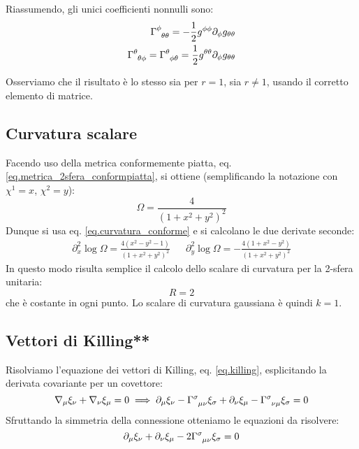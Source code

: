 Riassumendo, gli unici coefficienti nonnulli sono:
\begin{align*}
\tensor{\Gamma}{^\phi_{\theta\theta}} =  -\frac{1}{2}g^{\phi\phi}\partial_\phi g_{\theta\theta} \\
\tensor{\Gamma}{^\theta_{\theta\phi}} = \tensor{\Gamma}{^\theta_{\phi\theta}} =  \frac{1}{2}g^{\theta\theta}\partial_\phi g_{\theta\theta}
\end{align*}

Osserviamo che il risultato è lo stesso sia per $r=1$, sia $r\neq 1$, usando il corretto elemento di matrice.
\subsection{Curvatura scalare}
Facendo uso della metrica conformemente piatta, eq. \ref{eq.metrica_2sfera_conformpiatta}, si ottiene (semplificando la notazione con $\chi^1=x$, $\chi^2=y$):
\begin{equation*}
    \Omega = \frac{4}{(1 + x^2 + y^2)^2}
\end{equation*}
Dunque si usa eq. \ref{eq.curvatura_conforme} e si calcolano le due derivate seconde:
\begin{align*}
    \partial^2_x \log \Omega = \frac{4(x^2-y^2-1)}{(1+x^2+y^2)^2} & &
    \partial^2_y \log \Omega = -\frac{4(1 + x^2 - y^2)}{(1+x^2+y^2)^2}
\end{align*}
In questo modo risulta semplice il calcolo dello scalare di curvatura per la 2-sfera unitaria:
\begin{equation*}
    R=2
\end{equation*}
che è costante in ogni punto. Lo scalare di curvatura gaussiana è quindi $k=1$.
\subsection{Vettori di Killing**}
Risolviamo l'equazione dei vettori di Killing, eq. \ref{eq.killing}, esplicitando la derivata covariante per un covettore:
\begin{equation*}
    \nabla_\mu \xi_\nu + \nabla_\nu \xi_\mu = 0 \implies \partial_\mu \xi_\nu - \tensor{\Gamma}{^\sigma_{\mu\nu}}\xi_\sigma + \partial_\nu \xi_\mu - \tensor{\Gamma}{^\sigma_{\nu\mu}} \xi_\sigma = 0
\end{equation*}
Sfruttando la simmetria della connessione otteniamo le equazioni da risolvere:
\begin{equation*}
    \partial_\mu \xi_\nu + \partial_\nu \xi_\mu - 2 \tensor{\Gamma}{^\sigma_{\mu\nu}}\xi_\sigma = 0
\end{equation*}

